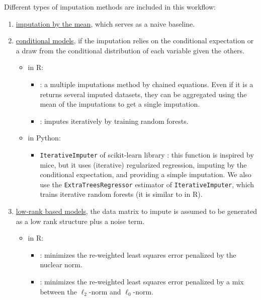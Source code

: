 Different types of imputation methods are included in this workflow:
\begin{enumerate}
    \item \underline{imputation by the mean}, which serves as a naive baseline. 
    \item \underline{conditional models}, if the imputation relies on the conditional expectation or a draw from the conditional distribution of each variable given the others.
    \begin{itemize}
        \item in {R}: 
        \begin{itemize}
            \item {} \citep{mice}: a multiple imputations method by chained equations.  Even if it is a returns several imputed datasets, they can be aggregated using the mean of the imputations to get a single imputation. 
            \item {} \citep{stekhoven2012missforest}: imputes iteratively by training random forests.
        \end{itemize}
        \item in {Python}:
        \begin{itemize}
            \item \texttt{IterativeImputer} of scikit-learn library \citep{pedregosa2011scikit}: this function is inspired by mice, but it uses (iterative) regularized regression, imputing by the conditional expectation, and providing a simple imputation. We also use the \texttt{ExtraTreesRegressor} estimator of \texttt{IterativeImputer}, which trains iterative random forests (it is similar to  in {R}).
        \end{itemize}
    \end{itemize}
    \item \underline{low-rank based models}, the data matrix to impute is assumed to be generated as a low rank structure plus a noise term.
    \begin{itemize}
        \item in {R}:  
        \begin{itemize}
            \item {} \citep{hastie2015matrix}: minimizes the re-weighted least squares error penalized by the nuclear norm.
            \item {} \citep{josse2016missmda}: minimizes the re-weighted least squares error penalized by a mix between the $\ell_2$-norm and $\ell_0$-norm. 

\end{itemize}
\end{itemize}
\end{enumerate}
